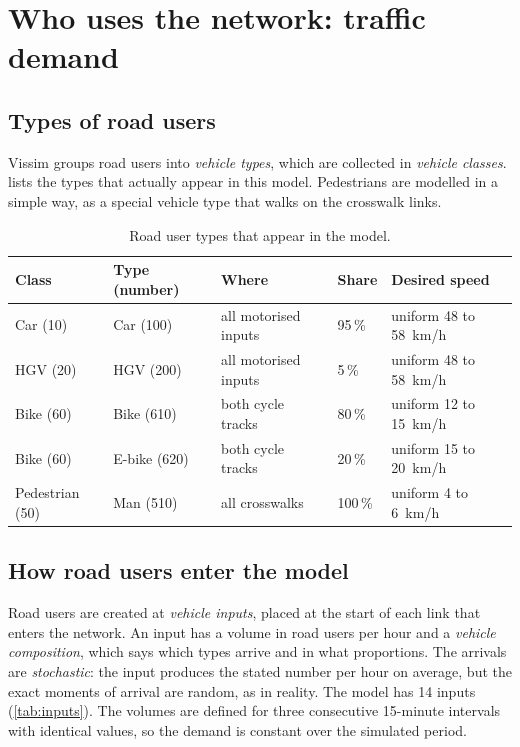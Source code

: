 \documentclass[11pt,a4paper]{article}
\newcommand{\kmh}{~km/h}
\begin{document}
\section{Who uses the network: traffic demand}
\label{sec:demand}

\subsection{Types of road users}

Vissim groups road users into \emph{vehicle types}, which are collected in \emph{vehicle classes}.
 lists the types that actually appear in this model. Pedestrians are modelled in a
simple way, as a special vehicle type that walks on the crosswalk links.

\begin{table}[!htb]
\centering
\caption[Road user types in the model]{Road user types that appear in the model.}
\label{tab:types}
\small
\begin{tabular}{lllll}
\toprule
\textbf{Class} & \textbf{Type (number)} & \textbf{Where} & \textbf{Share} & \textbf{Desired speed}\\
\midrule
Car (10)        & Car (100)    & all motorised inputs & 95\,\% & uniform 48 to 58\kmh\\
HGV (20)        & HGV (200)    & all motorised inputs & 5\,\%  & uniform 48 to 58\kmh\\
Bike (60)       & Bike (610)   & both cycle tracks    & 80\,\% & uniform 12 to 15\kmh\\
Bike (60)       & E-bike (620) & both cycle tracks    & 20\,\% & uniform 15 to 20\kmh\\
Pedestrian (50) & Man (510)    & all crosswalks       & 100\,\% & uniform 4 to 6\kmh\\
\bottomrule
\end{tabular}
\end{table}

\subsection{How road users enter the model}

Road users are created at \emph{vehicle inputs}, placed at the start of each link that enters the
network. An input has a volume in road users per hour and a \emph{vehicle composition}, which says
which types arrive and in what proportions. The arrivals are \emph{stochastic}: the input produces
the stated number per hour on average, but the exact moments of arrival are random, as in reality.
The model has 14 inputs (\cref{tab:inputs}). The volumes are defined for three consecutive
15-minute intervals with identical values, so the demand is constant over the simulated period.
\end{document}
